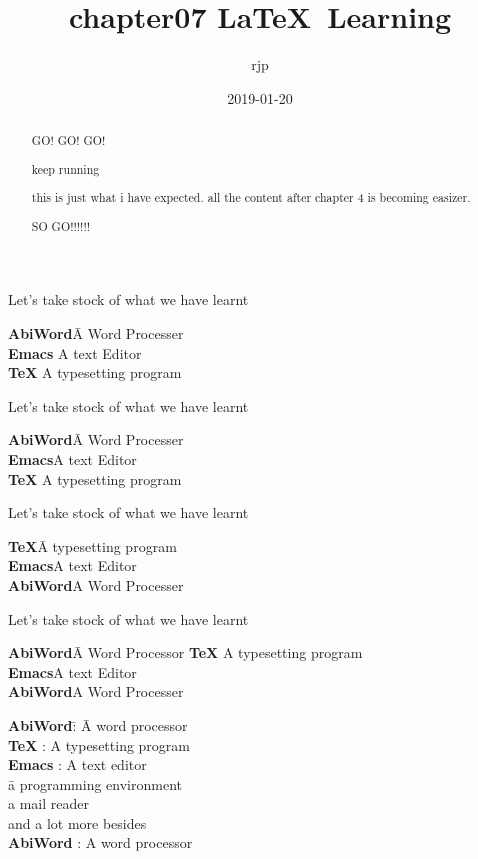 \documentclass[a4paper, UTF8]{article}
\begin{document}
\title{chapter07 \LaTeX\ Learning}
\author{rjp}
\date{2019-01-20}
\maketitle

\pagestyle{headings}
\thispagestyle{empty}
\begin{abstract}
    GO! GO! GO!

    keep running

    this is just what i have expected. all the content after chapter 4 is becoming easizer.

    SO GO!!!!!!
\end{abstract}
\newpage

Let's take stock of what we have learnt
\begin{tabbing}
    \hspace{1cm}\= \textbf{AbiWord}\quad\=A Word Processer\\[5pt]
                \> \textbf{Emacs} \>A text Editor\\[5pt]
                \> \textbf{\TeX} \> A typesetting program 
\end{tabbing}

Let's take stock of what we have learnt
\begin{tabbing}
    \textbf{AbiWord}\quad\=A Word Processer\\[5pt]
    \textbf{Emacs}\quad\>A text Editor\\[5pt]
    \textbf{\TeX}\quad\> A typesetting program 
\end{tabbing}

Let's take stock of what we have learnt
\begin{tabbing} 
    \textbf{\TeX}\quad\= A typesetting program\\[5pt]
    \textbf{Emacs}\quad\>A text Editor\\[5pt]
    \textbf{AbiWord}\quad\>A Word Processer
\end{tabbing}

Let's take stock of what we have learnt
\begin{tabbing} 
	\textbf{AbiWord}\quad\=A Word Processor\kill
    \textbf{\TeX}\quad\> A typesetting program\\[5pt]
    \textbf{Emacs}\quad\>A text Editor\\[5pt]
    \textbf{AbiWord}\quad\>A Word Processer
\end{tabbing}

\begin{tabbing} 
    \textbf{AbiWord}\quad\= : \= A word processor\kill\\ 
    \textbf{\TeX}\quad   \> : \> A typesetting program\\[5pt] 
    \textbf{Emacs}\quad  \> : \> A text editor\\[5pt] 
                        \>   \> \quad\= a programming environment\\[5pt] 
                        \>   \> \> a mail reader\\[5pt] 
                        \>   \> \> and a lot more besides\\[5pt]
    \textbf{AbiWord}\quad\> : \> A word processor 
\end{tabbing}
\end{document}
